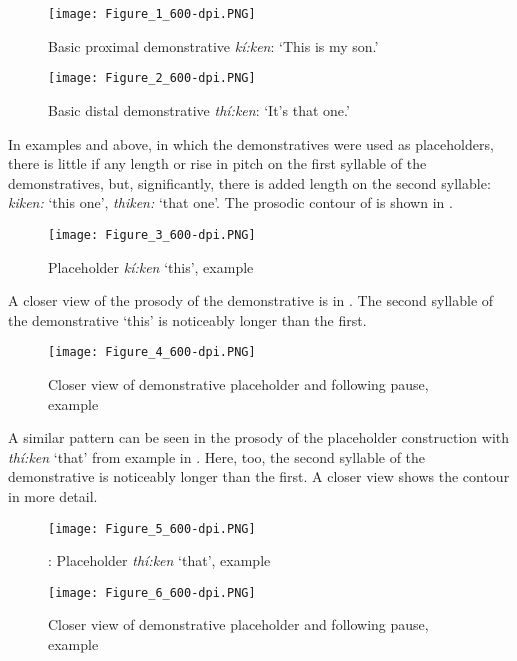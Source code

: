 \documentclass[output=paper]{langscibook}
\begin{document}
\begin{figure}
\texttt{[image: Figure\_1\_600-dpi.PNG]}
\caption{Basic proximal demonstrative \textit{kí:ken}: ‘This is my son.’}
\label{fig:mithun:1}
\end{figure}

\begin{figure}
\texttt{[image: Figure\_2\_600-dpi.PNG]}
\caption{Basic distal demonstrative \textit{thí:ken}:  ‘It’s that one.’}
\label{fig:mithun:2}
\end{figure}

In examples  and  above, in which the demonstratives were used as placeholders, there is little if any length or rise in pitch on the first syllable of the demonstratives, but, significantly, there is added length on the second syllable: \textit{kiken:} ‘this one’, \textit{thiken:} ‘that one’. The prosodic contour of  is shown in .



\begin{figure}
\texttt{[image: Figure\_3\_600-dpi.PNG]}
\caption{Placeholder \textit{kí:ken} ‘this’, example }
\label{fig:mithun:3}
\end{figure}

\largerpage
A closer view of the prosody of the demonstrative is in . The second syllable of the demonstrative ‘this’ is noticeably longer than the first.


\begin{figure}
\texttt{[image: Figure\_4\_600-dpi.PNG]}
\caption{Closer view of demonstrative placeholder and following pause, example }
\label{fig:mithun:4}
\end{figure}

A similar pattern can be seen in the prosody of the placeholder construction with \textit{thí:ken} ‘that’ from example  in . Here, too, the second syllable of the demonstrative is noticeably longer than the first. A closer view shows the contour in more detail.

  
\begin{figure}
\texttt{[image: Figure\_5\_600-dpi.PNG]}
\caption{\label{fig:mithun:5}:  Placeholder \textit{thí:ken} ‘that’, example }
\end{figure}


\begin{figure}
\texttt{[image: Figure\_6\_600-dpi.PNG]}
\caption{Closer view of demonstrative placeholder and following pause, example }
\label{fig:mithun:6}
\end{figure}
\end{document}
